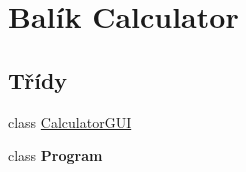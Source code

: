 \hypertarget{namespaceCalculator}{\section{Balík Calculator}
\label{namespaceCalculator}
}
\subsection*{Třídy}
\begin{DoxyCompactItemize}
\item 
class \hyperlink{classCalculator_1_1CalculatorGUI}{Calculator\-G\-U\-I}
\item 
class {\bfseries Program}
\end{DoxyCompactItemize}
